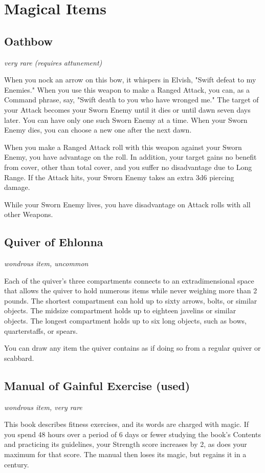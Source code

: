 \documentclass[letterpaper,openany,oneside,twocolumn]{book}
\begin{document}
\section*{Magical Items}
\subsection*{Oathbow}
\textit{very rare (requires attunement)}

When you nock an arrow on this bow, it whispers in Elvish, "Swift defeat to my Enemies." When you use this weapon to make a Ranged Attack, you can, as a Command phrase, say, "Swift death to you who have wronged me." The target of your Attack becomes your Sworn Enemy until it dies or until dawn seven days later. You can have only one such Sworn Enemy at a time. When your Sworn Enemy dies, you can choose a new one after the next dawn.

When you make a Ranged Attack roll with this weapon against your Sworn Enemy, you have advantage on the roll. In addition, your target gains no benefit from cover, other than total cover, and you suffer no disadvantage due to Long Range. If the Attack hits, your Sworn Enemy takes an extra 3d6 piercing damage.

While your Sworn Enemy lives, you have disadvantage on Attack rolls with all other Weapons.

\subsection*{Quiver of Ehlonna}
\textit{wondrous item, uncommon}

Each of the quiver's three compartments connects to an extradimensional space that allows the quiver to hold numerous items while never weighing more than 2 pounds. The shortest compartment can hold up to sixty arrows, bolts, or similar objects. The midsize compartment holds up to eighteen javelins or similar objects. The longest compartment holds up to six long objects, such as bows, quarterstaffs, or spears.

You can draw any item the quiver contains as if doing so from a regular quiver or scabbard.

\subsection*{Manual of Gainful Exercise (used)}
\textit{wondrous item, very rare}

This book describes fitness exercises, and its words are charged with magic. If you spend 48 hours over a period of 6 days or fewer studying the book's Contents and practicing its guidelines, your Strength score increases by 2, as does your maximum for that score. The manual then loses its magic, but regains it in a century.
\end{document}
